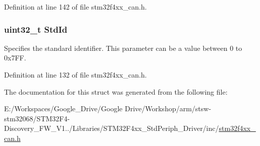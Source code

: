 Definition at line 142 of file stm32f4xx\-\_\-can.\-h.

\hypertarget{struct_can_tx_msg_a511131786af8d1534273e48ea2052245}{
\subsubsection[{Std\-Id}]{\setlength{\rightskip}{0pt plus 5cm}uint32\-\_\-t Std\-Id}}\label{struct_can_tx_msg_a511131786af8d1534273e48ea2052245}
Specifies the standard identifier. This parameter can be a value between 0 to 0x7\-F\-F. 

Definition at line 132 of file stm32f4xx\-\_\-can.\-h.



The documentation for this struct was generated from the following file\-:\begin{DoxyCompactItemize}
\item 
E\-:/\-Workspaces/\-Google\-\_\-\-Drive/\-Google Drive/\-Workshop/arm/stsw-\/stm32068/\-S\-T\-M32\-F4-\/\-Discovery\-\_\-\-F\-W\-\_\-\-V1../\-Libraries/\-S\-T\-M32\-F4xx\-\_\-\-Std\-Periph\-\_\-\-Driver/inc/\hyperlink{stm32f4xx__can_8h}{stm32f4xx\-\_\-can.\-h}\end{DoxyCompactItemize}
